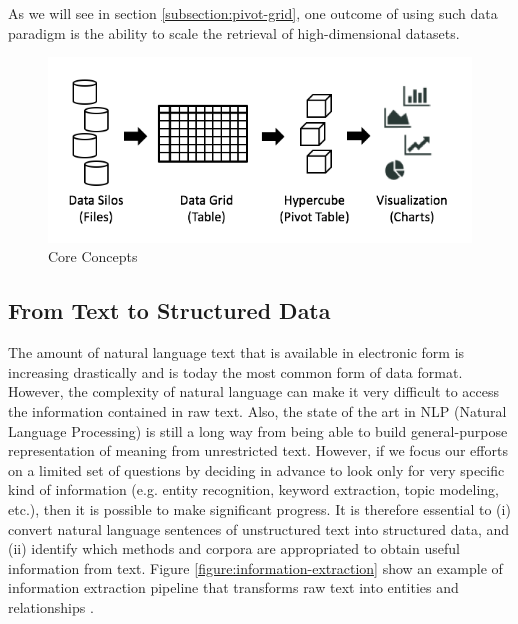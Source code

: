 \documentclass[10pt, a4paper, twocolumn]{article} %
\begin{document}

As we will see in section \ref{subsection:pivot-grid}, one outcome of using such data paradigm is the ability to scale the retrieval of high-dimensional datasets.
 

\begin{figure}
	\centering
	\includegraphics[scale=0.4]{images/concepts.png}
	\caption{Core Concepts}
	\label{figure:concepts}
\end{figure}


\subsection{From Text to Structured Data}
\label{subsection:text-data}

The amount of natural language text that is available in electronic form is increasing drastically and is today the most common form of data format.
However, the complexity of natural language can make it very difficult to access the information contained in raw text. Also, the state of the art in NLP (Natural Language Processing) is still a long way from being able to build general-purpose representation of meaning from unrestricted text. However, if we focus our efforts on a limited set of questions by deciding in advance to look only for very specific kind of information (e.g. entity recognition, keyword extraction, topic modeling, etc.), then it is possible to make significant progress.
It is therefore essential to (i) convert natural language sentences of unstructured text into structured data, and (ii) identify which methods and corpora are appropriated to obtain useful information from text.
Figure \ref{figure:information-extraction} show an example of information extraction pipeline that transforms raw text into entities and relationships \cite{nltk-book}. 
\end{document}
